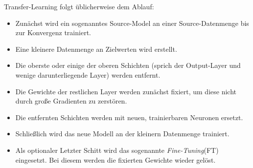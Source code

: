 Transfer-Learning folgt üblicherweise dem Ablauf:
\begin{itemize}
	\setlength\itemsep{0cm}
	\setlength{\parskip}{0cm}
	\item Zunächst wird ein sogenanntes Source-Model an einer Source-Datenmenge bis zur Konvergenz trainiert. 
	\item Eine kleinere Datenmenge an Zielwerten wird erstellt.
	\item Die oberste oder einige der oberen Schichten (sprich der Output-Layer und wenige darunterliegende Layer) werden entfernt.
	\item Die Gewichte der restlichen Layer werden zunächst fixiert, um diese nicht durch große Gradienten zu zerstören.
	\item Die entfernten Schichten werden mit neuen, trainierbaren Neuronen ersetzt.
	\item Schließlich wird das neue Modell an der kleinern Datenmenge trainiert.
	\item Als optionaler Letzter Schitt wird das sogenannte \textit{Fine-Tuning}(FT) eingesetzt. Bei diesem werden die fixierten Gewichte wieder gelöst.
\end{itemize}


